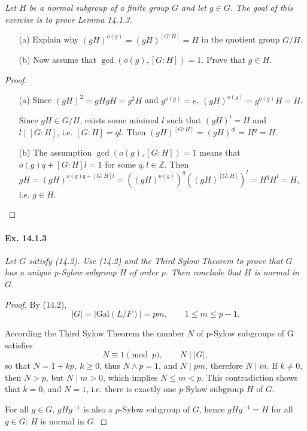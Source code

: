 \documentclass[11pt,a4paper]{article}
\newcommand{\Gal}{\mathrm{Gal}}
\begin{document}
{\it Let $H$ be a normal subgroup of a finite group $G$ and let $g\in G$. The goal of this exercise is to prove Lemma 14.1.3.
\begin{enumerate}
\item[(a)] Explain why $(gH)^{o(g)}=(gH)^{[G:H]}=H$ in the quotient group $G/H$.
\item[(b)] Now assume that $\gcd(o(g),[G:H])=1$. Prove that $g\in H$.
\end{enumerate}
}
\begin{proof}
\begin{enumerate}
\item[(a)] Since $(gH)^2=gHgH=g^2H$ and $g^{o(g)}=e$, $(gH)^{o(g)}=g^{o(g)}H=H$.

Since $gH\in G/H$, exists some minimal $l$ such that $(gH)^l=H$ and $l\mid [G:H]$, i.e. $[G:H]=ql$. Then $(gH)^{[G:H]}=(gH)^{ql}=H^q=H$.
\item[(b)] The assumption $\gcd(o(g),[G:H])=1$ means that $o(g)q+[G:H]l=1$ for some $q,l\in\mathbb{Z}$. Then $gH=(gH)^{o(g)q+[G:H]l}=((gH)^{o(g)})^q((gH)^{[G:H]})^l=H^qH^l=H$, i.e. $g\in H$.
\end{enumerate}

\end{proof}

\paragraph{Ex. 14.1.3}

{\it Let $G$ satisfy (14.2). Use (14.2) and the Third Sylow Theorem to prove that $G$ has a unique p-Sylow subgroup $H$ of order $p$. Then conclude that $H$ is normal in $G$.
}

\begin{proof}
By (14.2),
 $$|G|= |\Gal(L/F)| =pm, \qquad 1\leq m \leq p-1.$$

According the Third Sylow Theorem the number $N$ of p-Sylow subgroups of G satisfies
 $$N\equiv 1 \pmod p,  \qquad N\mid |G|,$$ 
so that $N = 1 + kp,\ k\geq 0$, thus $N \wedge p = 1$, and $N \mid pm$, therefore $N \mid m$. If $k\ne 0$, then $N>p$, but $N \mid m>0$, which implies $N \leq m <p$. This contradiction shows that $k = 0$, and $N = 1$, i.e. there is exactly one $p$-Sylow subgroup $H$ of $G$.

For all $g \in G$, $gHg^{-1}$ is also a $p$-Sylow subgroup of $G$, hence $gHg^{-1}=H$ for all
$g \in G$: $H$ is normal in $G$.

\end{proof}
\end{document}
